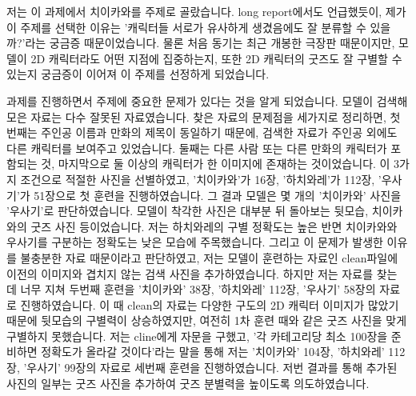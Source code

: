 \documentclass[11pt]{article}
\begin{document}
\makeheader
 저는 이 과제에서 치이카와를 주제로 골랐습니다. 
long report에서도 언급했듯이, 제가 이 주제를 선택한 이유는 '캐릭터들 서로가 유사하게 생겼음에도 잘 분류할 수 있을까?'라는 궁금증 때문이었습니다. 
물론 처음 동기는 최근 개봉한 극장판 때문이지만, 모델이 2D 캐릭터라도 어떤 지점에 집중하는지, 또한 2D 캐릭터의 굿즈도 잘 구별할 수 있는지 궁금증이 이어져 이 주제를 선정하게 되었습니다.

 과제를 진행하면서 주제에 중요한 문제가 있다는 것을 알게 되었습니다. 
모델이 검색해 모은 자료는 다수 잘못된 자료였습니다. 
찾은 자료의 문제점을 세가지로 정리하면, 첫번째는 주인공 이름과 만화의 제목이 동일하기 때문에, 검색한 자료가 주인공 외에도 다른 캐릭터를 보여주고 있었습니다. 
둘째는 다른 사람 또는 다른 만화의 캐릭터가 포함되는 것, 마지막으로 둘 이상의 캐릭터가 한 이미지에 존재하는 것이었습니다. 
이 3가지 조건으로 적절한 사진을 선별하였고, '치이카와'가 16장, '하치와레'가 112장, '우사기'가 51장으로 첫 훈련을 진행하였습니다. 그 결과 모델은 몇 개의 '치이카와' 사진을 '우사기'로 판단하였습니다. 
모델이 착각한 사진은 대부분 뒤 돌아보는 뒷모습, 치이카와의 굿즈 사진 등이었습니다. 저는 하치와레의 구별 정확도는 높은 반면 치이카와와 우사기를 구분하는 정확도는 낮은 모습에 주목했습니다. 
그리고 이 문제가 발생한 이유를 불충분한 자료 때문이라고 판단하였고, 저는 모델이 훈련하는 자료인 clean파일에 이전의 이미지와 겹치지 않는 검색 사진을 추가하였습니다. 
하지만 저는 자료를 찾는 데 너무 지쳐 두번째 훈련을 '치이카와' 38장, '하치와레' 112장, '우사기' 58장의 자료로 진행하였습니다. 
이 때 clean의 자료는 다양한 구도의 2D 캐릭터 이미지가 많았기 때문에 뒷모습의 구별력이 상승하였지만, 여전히 1차 훈련 때와 같은 굿즈 사진을 맞게 구별하지 못했습니다. 
저는 cline에게 자문을 구했고, '각 카테고리당 최소 100장을 준비하면 정확도가 올라갈 것이다'라는 말을 통해 저는 '치이카와' 104장, '하치와레' 112장, '우사기' 99장의 자료로 세번째 훈련을 진행하였습니다. 
저번 결과를 통해 추가된 사진의 일부는 굿즈 사진을 추가하여 굿즈 분별력을 높이도록 의도하였습니다. 
\end{document}
